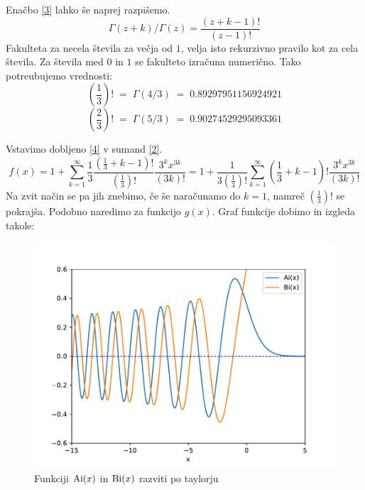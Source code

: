 Enačbo \eqref{3} lahko še naprej razpišemo.
\begin{equation}
    \Gamma(z+k)/\Gamma(z) = \frac{(z+k-1)!}{(z-1)!}\label{4}
\end{equation}
Fakulteta za necela števila za večja od $1$, velja isto rekurzivno
pravilo kot za cela števila. Za števila med $0$ in $1$ se fakulteto izračuna numerično.
Tako potreubujemo vrednosti:
\begin{equation}
    \left(\frac{1}{3}\right)! \;=\;\Gamma(4/3) \;=\; 0.89297951156924921
\end{equation}
\begin{equation}
    \left(\frac{2}{3}\right)! \;=\;\Gamma(5/3) \;=\; 0.90274529295093361
\end{equation}

Vstavimo dobljeno \eqref{4} v sumand \eqref{2}.
\begin{equation}
    f(x) = 1+\sum_{k=1}^{\infty}\frac{1}{3}\frac{(\frac{1}{3}+k-1)!}{\left(\frac{1}{3}\right)!}
    \frac{3^k x^{3k}}{(3k)!} = 1+\frac{1}{3\left(\frac{1}{3}\right)!}\sum_{k=1}^{\infty}(\frac{1}{3}+k-1)!\frac{3^k x^{3k}}{(3k)!}
\end{equation}
Na zvit način se pa jih znebimo, če še naračunamo do $k=1$, namreč $\left(\frac{1}{3}\right)!$ se pokrajša. Podobno naredimo za funkcijo $g(x)$.
Graf funkcije dobimo in izgleda takole:
\begin{figure}[h]
    \begin{center}
        \includegraphics[width=13cm]{sections/poglavje1/pdfs/small_airy.pdf}
        \caption{Funkciji $\mathrm{Ai}(x)$ in $\mathrm{Bi}(x)$ razviti po taylorju}
        \label{slika 2}
    \end{center}
\end{figure}

